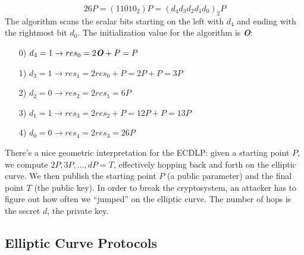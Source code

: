 \documentclass[11pt, a4paper]{article}
\newcommand{\doublequotes}[1]{“#1”}
\begin{document}
$$26P=(11010_2)P=(d_4d_3d_2d_1d_0)_2P$$
The algorithm scans the scalar bits starting on the left with $d_4$ and ending with the rightmost bit $d_0$. The initialization value for the algorithm is \textbf{\textit{O}}:
\begin{enumerate}
    \item[0)] $d_4=1\rightarrow res_0=2\text{\textbf{\textit{O}}}+P=P$
    \item[1)] $d_3=1\rightarrow res_1=2res_0+P=2P+P=3P$
    \item[2)] $d_2=0\rightarrow res_2=2res_1=6P$
    \item[3)] $d_1=1\rightarrow res_3=2res_2+P=12P+P=13P$
    \item[4)] $d_0=0\rightarrow res_4=2res_3=26P$
\end{enumerate}
There's a nice geometric interpretation for the ECDLP: given a starting point $P$, we compute $2P,3P,...,dP=T$, effectively hopping back and forth on the elliptic curve. We then publish the starting point $P$ (a public parameter) and the final point $T$ (the public key). In order to break the cryptosystem, an attacker has to figure out how often we \doublequotes{jumped} on the elliptic curve. The number of hops is the secret $d$, the private key.

\newpage
\subsection{Elliptic Curve Protocols}
\end{document}
